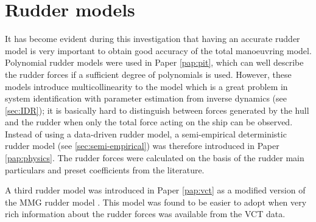 \section{Rudder models} \label{sec:rudders}
It has become evident during this investigation that having an accurate rudder model is very important to obtain good accuracy of the total manoeuvring model. Polynomial rudder models were used in Paper \ref{pap:pit}, which can well describe the rudder forces if a sufficient degree of polynomials is used. However, these models introduce multicollinearity to the model which is a great problem in system identification with parameter estimation from inverse dynamics (see \autoref{sec:IDR}); it is basically hard to distinguish between forces generated by the hull and the rudder when only the total force acting on the ship can be observed. Instead of using a data-driven rudder model, a semi-empirical deterministic rudder model (see \autoref{sec:semi-empirical}) was therefore introduced in Paper \ref{pap:physics}. The rudder forces were calculated on the basis of the rudder main particulars and preset coefficients from the literature.

A third rudder model was introduced in Paper \ref{pap:vct} as a modified version of the MMG rudder model \cite{yasukawaIntroductionMMGStandard2015}. This model was found to be easier to adopt when very rich information about the rudder forces was available from the VCT data.



